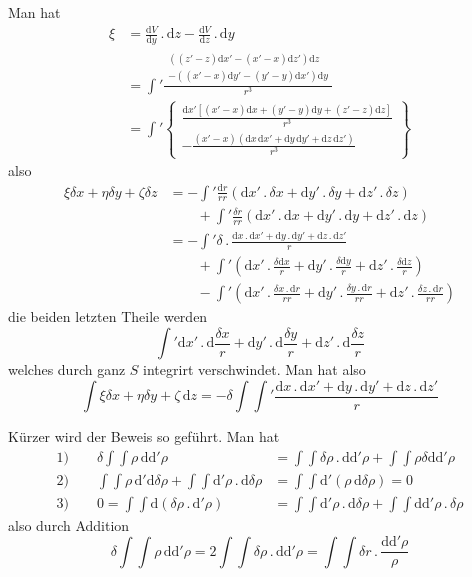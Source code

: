 Man hat
\[
\begin{aligned}
\xi&=\frac{\mathrm dV}{\mathrm dy}\,.\,\mathrm dz-\frac{\mathrm dV}{\mathrm dz}\,.\,\mathrm dy\\[4pt]
&=\int'\frac{\begin{gathered}((z'-z)\mathrm dx'-(x'-x)\mathrm dz')\mathrm dz\\-((x'-x)\mathrm dy'-(y'-y)\mathrm dx')\mathrm dy\end{gathered}}{r^3}\\[4pt]
&=\int'\left\{\begin{gathered}\frac{\mathrm dx'[(x'-x)\mathrm dx+(y'-y)\mathrm dy+(z'-z)\mathrm dz]}{r^3}\\-\frac{(x'-x)(\mathrm dx\,\mathrm dx'+\mathrm dy\,\mathrm dy'+\mathrm dz\,\mathrm dz')}{r^3}\end{gathered}\right\}
\end{aligned}
\]
also
\[
\begin{aligned}
\xi\delta x+\eta\delta y+\zeta\delta z&=-\int'\frac{\mathrm dr}{rr}(\mathrm dx'\,.\,\delta x+\mathrm dy'\,.\,\delta y+\mathrm dz'\,.\,\delta z)\\
&\qquad+\int'\frac{\delta r}{rr}(\mathrm dx'\,.\,\mathrm dx+\mathrm dy'\,.\,\mathrm dy+\mathrm dz'\,.\,\mathrm dz)\\
&=-\int'\delta\,.\,\frac{\mathrm dx\,.\,\mathrm dx'+\mathrm dy\,.\,\mathrm dy'+\mathrm dz\,.\,\mathrm dz'}{r}\\
&\qquad+\int'\left(\mathrm dx'\,.\,\frac{\delta\mathrm dx}{r}+\mathrm dy'\,.\,\frac{\delta\mathrm dy}{r}+\mathrm dz'\,.\,\frac{\delta\mathrm dz}{r}\right)\\
&\qquad-\int'\left(\mathrm dx'\,.\,\frac{\delta x\,.\,\mathrm dr}{rr}+\mathrm dy'\,.\,\frac{\delta y\,.\,\mathrm dr}{rr}+\mathrm dz'\,.\,\frac{\delta z\,.\,\mathrm dr}{rr}\right)
\end{aligned}
\]
die beiden letzten Theile werden
\[
\int'\mathrm dx'\,.\,\mathrm d\frac{\delta x}{r}+\mathrm dy'\,.\,\mathrm d\frac{\delta y}{r}+\mathrm dz'\,.\,\mathrm d\frac{\delta z}{r}
\]
welches durch ganz $S$ integrirt verschwindet. Man hat also
\[
\int\xi\delta x+\eta\delta y+\zeta\,\mathrm dz=-\delta\int\int'\frac{\mathrm dx\,.\,\mathrm dx'+\mathrm dy\,.\,\mathrm dy'+\mathrm dz\,.\,\mathrm dz'}{r}
\]

Kürzer wird der Beweis so geführt. Man hat
\[
\begin{aligned}
\text{1)}\qquad\delta\int\int\rho\,\mathrm d\mathrm d'\rho&=\int\int\delta\rho\,.\,\mathrm d\mathrm d'\rho+\int\int\rho\delta\mathrm d\mathrm d'\rho\\[4pt]
\text{2)}\qquad\int\int\rho\,\mathrm d'\mathrm d\delta\rho+\int\int\mathrm d'\rho\,.\,\mathrm d\delta\rho&=\int\int\mathrm d'(\rho\,\mathrm d\delta\rho)=0\\[4pt]
\text{3)}\qquad0=\int\int\mathrm d(\delta\rho\,.\,\mathrm d'\rho)&=\int\int\mathrm d'\rho\,.\,\mathrm d\delta\rho+\int\int\mathrm d\mathrm d'\rho\,.\,\delta\rho
\end{aligned}
\]
also durch Addition
\[
\delta\int\int\rho\,\mathrm d\mathrm d'\rho=2\int\int\delta\rho\,.\,\mathrm d\mathrm d'\rho=\int\int\delta r\,.\,\frac{\mathrm d\mathrm d'\rho}{\rho}
\]

